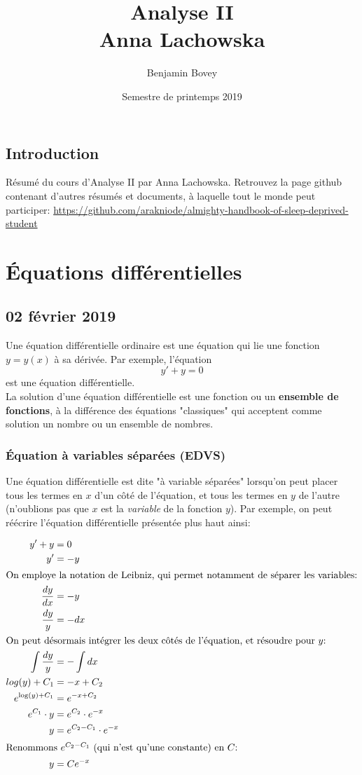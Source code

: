 \documentclass{report}
\title{Analyse II \\ Anna Lachowska}
\author{Benjamin Bovey}
\date{Semestre de printemps 2019}
\begin{document}
\section*{Introduction}
Résumé du cours d'Analyse II par Anna Lachowska. Retrouvez la page github contenant d'autres résumés et documents, à laquelle tout le monde peut participer: \url{https://github.com/arakniode/almighty-handbook-of-sleep-deprived-student}

\chapter{Équations différentielles}

\section{02 février 2019}
Une équation différentielle ordinaire est une équation qui lie une fonction $y = y(x)$ à sa dérivée. Par exemple, l'équation
\begin{equation}
	y' + y = 0
\end{equation}
est une équation différentielle. 
\\
La solution d'une équation différentielle est une fonction ou un \textbf{ensemble de fonctions}, à la différence des équations "classiques" qui acceptent comme solution un nombre ou un ensemble de nombres. 

\subsection{Équation à variables séparées (EDVS)}
Une équation différentielle est dite "à variable séparées" lorsqu'on peut placer tous les termes en $x$ d'un côté de l'équation, et tous les termes en $y$ de l'autre (n'oublions pas que $x$ est la \emph{variable} de la fonction $y$). Par exemple, on peut réécrire l'équation différentielle présentée plus haut ainsi:

\begin{align*}
	y' + y &= 0 \\
	y' &= -y \\
\intertext{On employe la notation de Leibniz, qui permet notamment de séparer les variables:}
	\dfrac{dy}{dx} &= -y \\
	\dfrac{dy}{y} &= -dx \\
\intertext{On peut désormais intégrer les deux côtés de l'équation, et résoudre pour $y$:}
	\int \dfrac{dy}{y} &= -\int dx \\
	log(y) + C_1 &= -x + C_2 \\
	e^{\log(y) + C_1} &= e^{-x + C_2} \\
	e^{C_1} \cdot y &= e^{C_2} \cdot e^{-x} \\
	y &= e^{C_2 - C_1} \cdot e^{-x} \\
\intertext{Renommons $e^{C_2 - C_1}$ (qui n'est qu'une constante) en $C$:}
	y &= Ce^{-x}
\end{align*}
\end{document}
